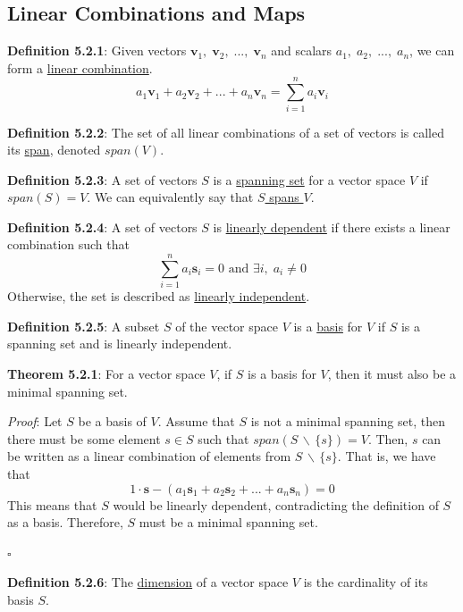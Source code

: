 \documentclass{article}
\newcommand{\separate}[1] {\vspace{#1 pt}\noindent}
\newcommand{\definition}[2]{\textbf{Definition #1}: #2\label{def:#1}}
\newcommand{\proof}[2]{\textit{Proof}: #2 \begin{flushright}\(\square\)\end{flushright}\label{prf:#1}}
\newcommand{\theorem}[3]{\textbf{Theorem #1}: #2 \par\separate{3}\proof{thm:#1}{#3}\label{thm:#1}}
\begin{document}
\subsection{Linear Combinations and Maps}

\definition{5.2.1}{Given vectors \(\mathbf{v}_1,\;\mathbf{v}_2,\;...,\;\mathbf{v}_n\) and scalars \(a_1,\;a_2,\;...,\;a_n\), we can form a \underline{linear combination}.}
\begin{equation}
    a_1\mathbf{v}_1 + a_2\mathbf{v}_2 + ... + a_n\mathbf{v}_n = \sum^n_{i=1}a_i\mathbf{v}_i
\end{equation}

\separate{7}\definition{5.2.2}{The set of all linear combinations of a set of vectors is called its \underline{span}, denoted \(span(V)\).}

\separate{7}\definition{5.2.3}{A set of vectors \(S\) is a \underline{spanning set} for a vector space \(V\) if \(span(S)=V\). We can equivalently say that \underline{\(S\) spans \(V\)}.}

\separate{7}\definition{5.2.4}{A set of vectors \(S\) is \underline{linearly dependent} if there exists a linear combination such that
\begin{equation}
    \sum_{i=1}^{n}a_i\mathbf{s}_i = 0 \text{ and } \exists i, \;a_i \neq 0
\end{equation}
Otherwise, the set is described as \underline{linearly independent}.}

\separate{7}\definition{5.2.5}{A subset \(S\) of the vector space \(V\) is a \underline{basis} for \(V\) if \(S\) is a spanning set and is linearly independent.}

\separate{7}\theorem{5.2.1}{For a vector space \(V\), if \(S\) is a basis for \(V\), then it must also be a minimal spanning set.}
{Let \(S\) be a basis of \(V\). Assume that \(S\) is not a minimal spanning set, then there must be some element \(s \in S\) such that \(span(S \,\backslash\, \{s\}) = V\). Then, \(s\) can be written as a linear combination of elements from \(S \,\backslash\, \{s\}\). That is, we have that
\begin{equation}
    1 \cdot \mathbf{s} - (a_1\mathbf{s}_1 + a_2\mathbf{s}_2 + ... + a_n\mathbf{s}_n) = 0
\end{equation}
This means that \(S\) would be linearly dependent, contradicting the definition of \(S\) as a basis. Therefore, \(S\) must be a minimal spanning set.}

\separate{7}\definition{5.2.6}{The \underline{dimension} of a vector space \(V\) is the cardinality of its basis \(S\).}
\end{document}
